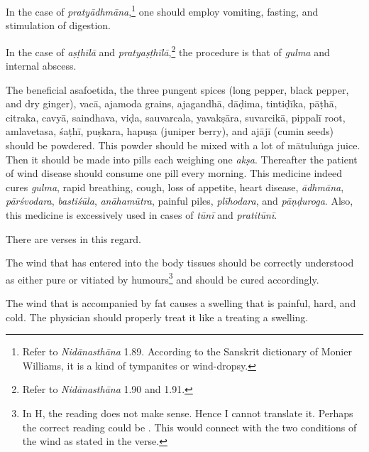 \begin{translation}
\begin{tt}
In the case of \textit{pratyādhmāna},\footnote{Refer to
    \textit{Nidānasthāna} 1.89. According to the Sanskrit dictionary of
    Monier Williams, it is a kind of tympanites or wind-dropsy.} one
    should employ vomiting, fasting, and stimulation of digestion.

\item[27]

In the case of \textit{aṣṭhīlā} and
\textit{pratyaṣṭhīlā},\footnote{Refer to \textit{Nidānasthāna} 1.90
    and 1.91.} the procedure is that of \textit{gulma} and internal
    abscess.

\item[28]

The beneficial asafoetida, the three pungent spices (long pepper,
black pepper, and dry ginger), \gls{vacā}, \gls{ajamoda} grains,
\gls{ajagandhā}, \gls{dāḍima}, \gls{tintiḍīka}, \gls{pāṭhā},
\gls{citraka}, \gls{cavyā}, \gls{saindhava}, \gls{viḍa},
\gls{sauvarcala}, \gls{yavakṣāra}, \gls{suvarcikā}, \gls{pippalī}
root, \gls{amlavetasa}, \gls{śaṭhī}, \gls{puṣkara}, \gls{hapuṣa}
(juniper berry), and \gls{ajājī} (cumin seeds) should be powdered.
This powder should be mixed with a lot of \gls{mātuluṅga} juice. Then
it should be made into pills each weighing one \textit{akṣa}.
Thereafter the patient of wind disease should consume one pill every
morning. This medicine indeed cures \textit{gulma}, rapid breathing,
cough, loss of appetite, heart disease, \textit{ādhmāna},
\textit{pārśvodara}, \textit{bastiśūla}, \textit{anāhamūtra}, painful
piles, \textit{plīhodara}, and \textit{pāṇḍuroga}. Also, this medicine
is excessively used in cases of \textit{tūnī} and \textit{pratitūnī}.

\item[29]

There are verses in this regard.

\begin{sloka}
The wind that has entered into the body tissues should be correctly
understood as either pure or vitiated by humours\footnote{In H, the
    reading  does not make sense. Hence I cannot
    translate it. Perhaps the correct reading could be
    . This would connect with the two conditions of
    the wind as stated in the verse.} and should be cured accordingly.
\end{sloka}

\item[30]

\begin{sloka}
The wind that is accompanied by fat causes a swelling that is painful,
hard, and cold. The physician should properly treat it like a treating
a swelling.
\end{sloka}


\end{tt}
\end{translation}
